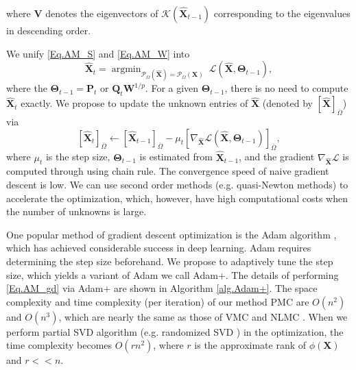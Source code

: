 \documentclass[letterpaper]{article} %
\begin{document}
where $\bm{V}$ denotes the eigenvectors of $\mathcal{K}(\hat{\bm{X}}_{t-1})$ corresponding to the eigenvalues in descending order. 

We unify \eqref{Eq.AM_S} and \eqref{Eq.AM_W} into
\begin{equation}\label{Eq.AM_unif}
\hat{\bm{X}}_t=\mathop{\arg\min}_{\mathcal{P}_{\Omega}(\hat{\bm{X}})=\mathcal{P}_{\Omega}(\bm{X})}\ \mathcal{L}(\hat{\bm{X}},\bm{\Theta}_{t-1}),
\end{equation}
where the $\bm{\Theta}_{t-1}=\bm{P}_t$ or $\bm{Q}_t\bm{W}^{1/p}$. For a given $\bm{\Theta}_{t-1}$, there is no need to compute $\hat{\bm{X}}_t$ exactly. We propose to update the unknown entries of $\hat{\bm{X}}$ (denoted by $[\hat{\bm{X}}]_{\bar{\Omega}}$) via
\begin{equation}\label{Eq.AM_gd}
[\hat{\bm{X}}_t]_{\bar{\Omega}}\leftarrow [\hat{\bm{X}}_{t-1}]_{\bar{\Omega}}-\mu_t[\nabla_{\hat{\bm{X}}}\mathcal{L}(\hat{\bm{X}},\bm{\Theta}_{t-1})]_{\bar{\Omega}},
\end{equation}
where $\mu_t$ is the step size, $\bm{\Theta}_{t-1}$ is estimated from $\hat{\bm{X}}_{t-1}$, and the gradient $\nabla_{\hat{\bm{X}}}\mathcal{L}$ is computed through using chain rule. The convergence speed of naive gradient descent is low. We can use second order methods (e.g. quasi-Newton methods) to accelerate the optimization, which, however, have high computational costs when the number of unknowns is large.

One popular method of gradient descent optimization is the Adam algorithm \cite{adam2014}, which has achieved considerable success in deep learning. 
Adam requires determining the step size beforehand. We propose to adaptively tune the step size, which yields a variant of Adam we call Adam+. The details of performing \eqref{Eq.AM_gd} via Adam+ are shown in Algorithm \ref{alg.Adam+}. The space complexity and time complexity (per iteration) of our method PMC are $O(n^2)$ and $O(n^3)$, which are nearly the same as those of VMC \cite{pmlr-v70-ongie17a} and NLMC \cite{FANNLMC}. When we perform partial SVD algorithm (e.g. randomized SVD \cite{randomsvd}) in the optimization, the time complexity becomes $O(rn^2)$, where $r$ is the approximate rank of $\phi(\bm{X})$ and $r<<n$.
\end{document}
